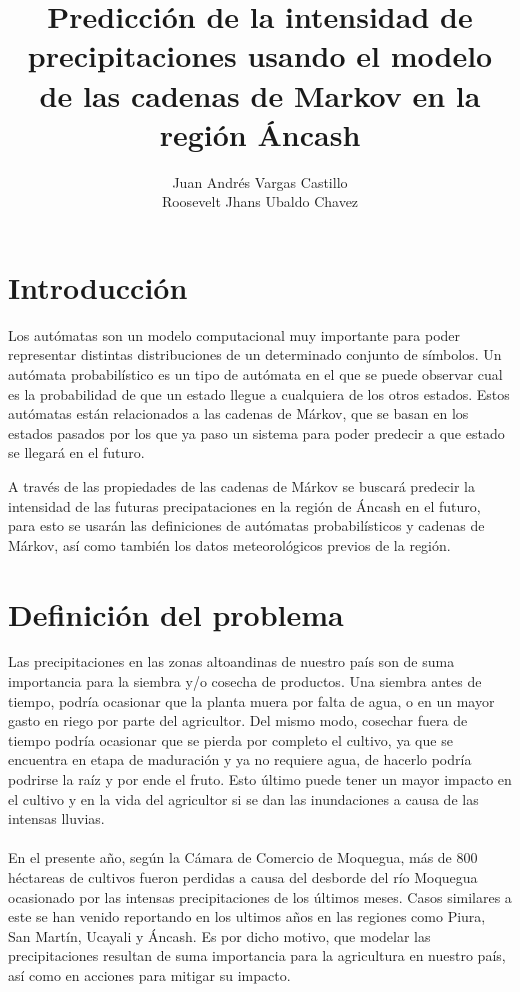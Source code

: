 \documentclass{article}
\title{Predicción de la intensidad de precipitaciones usando el modelo de las cadenas de Markov en la región Áncash}
\author{Juan Andrés Vargas Castillo\\Roosevelt Jhans Ubaldo Chavez}
\begin{document}
\maketitle

\tableofcontents
\newpage

\section{Introducción}

Los autómatas son un modelo computacional muy importante para poder representar distintas distribuciones de un determinado conjunto de símbolos. Un autómata probabilístico es un tipo de autómata en el que se puede observar cual es la probabilidad de que un estado llegue a cualquiera de los otros estados. Estos autómatas están relacionados a las cadenas de Márkov, que se basan en los estados pasados por los que ya paso un sistema para poder predecir a que estado se llegará en el futuro.

A través de las propiedades de las cadenas de Márkov se buscará predecir la intensidad de las futuras precipataciones en la región de Áncash en  el futuro, para esto se usarán las definiciones de autómatas probabilísticos y cadenas de Márkov, así como también los datos meteorológicos previos de la región.

\section{Definición del problema}

Las precipitaciones en las zonas altoandinas de nuestro país son de suma importancia para la siembra y/o cosecha de productos. Una siembra antes de tiempo, podría ocasionar que la planta muera por falta de agua, o en un mayor gasto en riego por parte del agricultor. Del mismo modo, cosechar fuera de tiempo podría ocasionar que se pierda por completo el cultivo, ya que se encuentra en etapa de maduración y ya no requiere agua, de hacerlo podría podrirse la raíz y por ende el fruto. Esto último puede tener un mayor impacto en el cultivo y en la vida del agricultor si se dan las inundaciones a causa de las intensas lluvias.
\\\\
En el presente año, según la Cámara de Comercio de Moquegua, más de 800 héctareas de cultivos fueron perdidas a causa del desborde del río Moquegua ocasionado por las intensas precipitaciones de los últimos meses. Casos similares a este se han venido reportando en los ultimos años en las regiones como Piura, San Martín, Ucayali y Áncash. Es por dicho motivo, que modelar las precipitaciones resultan de suma importancia para la agricultura en nuestro país, así como en acciones para mitigar su impacto.
\end{document}

